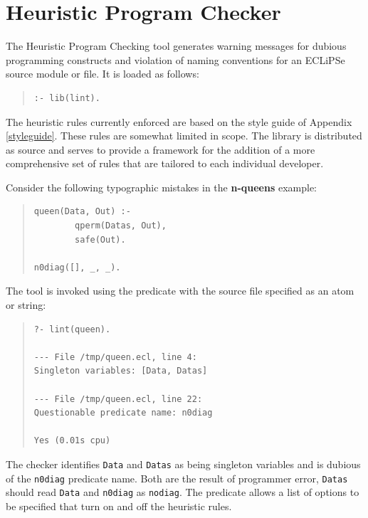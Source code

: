 \section{Heuristic Program Checker}

The Heuristic Program Checking tool generates warning messages for 
dubious programming constructs and violation of naming conventions for 
an ECLiPSe source module or file. It is loaded as follows:

\begin{quote}
\begin{verbatim}
:- lib(lint).
\end{verbatim}
\end{quote}

The heuristic rules currently enforced are based on the style guide of
Appendix \ref{styleguide}. These rules are somewhat limited in scope. The library 
is distributed as source and serves to provide a framework for the 
addition of a more comprehensive set of rules that are tailored to each
individual developer.

Consider the following typographic mistakes in the \textbf{n-queens} 
example:

\begin{quote}
\begin{verbatim}
queen(Data, Out) :-
        qperm(Datas, Out),
        safe(Out).

n0diag([], _, _).
\end{verbatim}
\end{quote}

The tool is invoked using the
 predicate with the source
file specified as an atom or string:

\begin{quote}
\begin{verbatim}
?- lint(queen).
 
--- File /tmp/queen.ecl, line 4:
Singleton variables: [Data, Datas]
 
--- File /tmp/queen.ecl, line 22:
Questionable predicate name: n0diag
 
Yes (0.01s cpu)
\end{verbatim}
\end{quote}

The checker identifies {\tt Data} and {\tt Datas} as being singleton variables
and is dubious of the {\tt n0diag} predicate name. Both are the result of 
programmer error, {\tt Datas} should read {\tt Data} and {\tt n0diag} 
as {\tt nodiag}. The  
predicate allows a list of options to be specified that turn on 
and off the heuristic rules.

